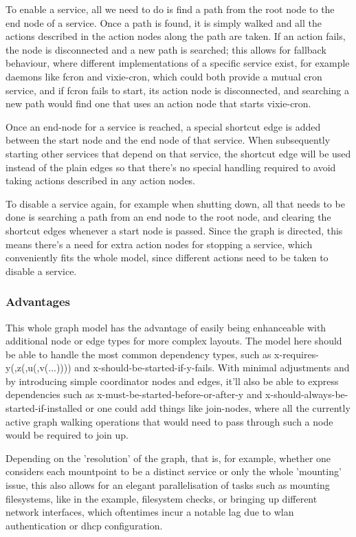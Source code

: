 \documentclass[a4paper,twoside,titlepage]{article}
\begin{document}
To enable a service, all we need to do is find a path from the root node to the
end node of a service. Once a path is found, it is simply walked and all the
actions described in the action nodes along the path are taken. If an action
fails, the node is disconnected and a new path is searched; this allows for
fallback behaviour, where different implementations of a specific service exist,
for example daemons like fcron and vixie-cron, which could both provide a mutual
cron service, and if fcron fails to start, its action node is disconnected, and
searching a new path would find one that uses an action node that starts
vixie-cron.

Once an end-node for a service is reached, a special shortcut edge is added
between the start node and the end node of that service. When subsequently
starting other services that depend on that service, the shortcut edge will be
used instead of the plain edges so that there's no special handling required to
avoid taking actions described in any action nodes.

To disable a service again, for example when shutting down, all that needs to be
done is searching a path from an end node to the root node, and clearing the
shortcut edges whenever a start node is passed. Since the graph is directed,
this means there's a need for extra action nodes for stopping a service, which
conveniently fits the whole model, since different actions need to be taken to
disable a service.

\subsubsection{Advantages}
This whole graph model has the advantage of easily being enhanceable with
additional node or edge types for more complex layouts. The model here should be
able to handle the most common dependency types, such as
x-requires-y(,z(,u(,v(...)))) and x-should-be-started-if-y-fails. With minimal
adjustments and by introducing simple coordinator nodes and edges, it'll also be
able to express dependencies such as x-must-be-started-before-or-after-y and
x-should-always-be-started-if-installed or one could add things like join-nodes,
where all the currently active graph walking operations that would need to pass
through such a node would be required to join up.

Depending on the 'resolution' of the graph, that is, for example, whether one
considers each mountpoint to be a distinct service or only the whole 'mounting'
issue, this also allows for an elegant parallelisation of tasks such as mounting
filesystems, like in the example, filesystem checks, or bringing up different
network interfaces, which oftentimes incur a notable lag due to wlan
authentication or dhcp configuration.
\end{document}
